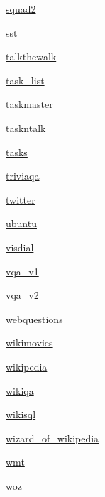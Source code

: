 \begin{DoxyCompactItemize}
\item 
 \hyperlink{namespaceparlai_1_1tasks_1_1squad2}{squad2}
\item 
 \hyperlink{namespaceparlai_1_1tasks_1_1sst}{sst}
\item 
 \hyperlink{namespaceparlai_1_1tasks_1_1talkthewalk}{talkthewalk}
\item 
 \hyperlink{namespaceparlai_1_1tasks_1_1task__list}{task\+\_\+list}
\item 
 \hyperlink{namespaceparlai_1_1tasks_1_1taskmaster}{taskmaster}
\item 
 \hyperlink{namespaceparlai_1_1tasks_1_1taskntalk}{taskntalk}
\item 
 \hyperlink{namespaceparlai_1_1tasks_1_1tasks}{tasks}
\item 
 \hyperlink{namespaceparlai_1_1tasks_1_1triviaqa}{triviaqa}
\item 
 \hyperlink{namespaceparlai_1_1tasks_1_1twitter}{twitter}
\item 
 \hyperlink{namespaceparlai_1_1tasks_1_1ubuntu}{ubuntu}
\item 
 \hyperlink{namespaceparlai_1_1tasks_1_1visdial}{visdial}
\item 
 \hyperlink{namespaceparlai_1_1tasks_1_1vqa__v1}{vqa\+\_\+v1}
\item 
 \hyperlink{namespaceparlai_1_1tasks_1_1vqa__v2}{vqa\+\_\+v2}
\item 
 \hyperlink{namespaceparlai_1_1tasks_1_1webquestions}{webquestions}
\item 
 \hyperlink{namespaceparlai_1_1tasks_1_1wikimovies}{wikimovies}
\item 
 \hyperlink{namespaceparlai_1_1tasks_1_1wikipedia}{wikipedia}
\item 
 \hyperlink{namespaceparlai_1_1tasks_1_1wikiqa}{wikiqa}
\item 
 \hyperlink{namespaceparlai_1_1tasks_1_1wikisql}{wikisql}
\item 
 \hyperlink{namespaceparlai_1_1tasks_1_1wizard__of__wikipedia}{wizard\+\_\+of\+\_\+wikipedia}
\item 
 \hyperlink{namespaceparlai_1_1tasks_1_1wmt}{wmt}
\item 
 \hyperlink{namespaceparlai_1_1tasks_1_1woz}{woz}
\end{DoxyCompactItemize}
